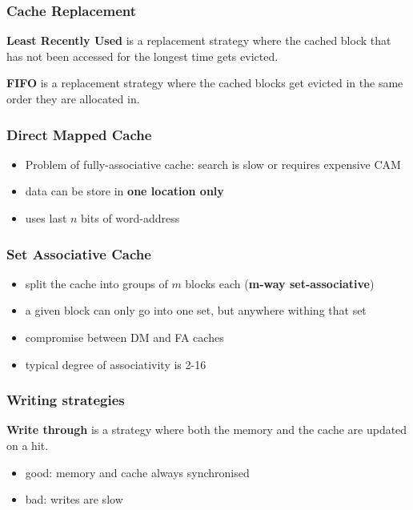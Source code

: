 \documentclass{article}
\begin{document}
\subsubsection{Cache Replacement}

\begin{definition}
	\textbf{Least Recently Used} is a replacement strategy where the cached block that has not been accessed
	for the longest time gets evicted.
\end{definition}
\begin{definition}
	\textbf{FIFO} is a replacement strategy where the cached blocks get evicted in the same order they are
	allocated in.
\end{definition}

\subsubsection{Direct Mapped Cache}

\begin{itemize}
	\item Problem of fully-associative cache: search is slow or requires expensive CAM
	\item data can be store in \textbf{one location only}
	\item uses last $n$ bits of word-address
\end{itemize}

\subsubsection{Set Associative Cache}

\begin{itemize}
	\item split the cache into groups of $m$ blocks each (\textbf{m-way set-associative})
	\item a given block can only go into one set, but anywhere withing that set
	\item compromise between DM and FA caches
	\item typical degree of associativity is 2-16
\end{itemize}

\subsubsection{Writing strategies}

\begin{definition}
	\textbf{Write through} is a strategy where both the memory and the cache
	are updated on a hit.
	\begin{itemize}
		\item good: memory and cache always synchronised
		\item bad: writes are slow
	\end{itemize}
\end{definition}
\end{document}
